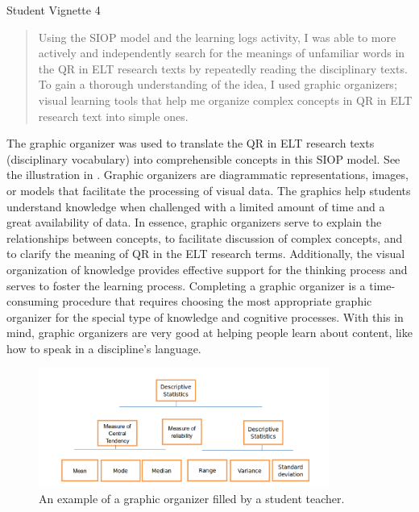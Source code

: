 \documentclass[english]{textolivre}
\begin{document}
Student Vignette 4

\begin{quote}
    Using the SIOP model and the learning logs activity, I was able to more actively and independently search for the meanings of unfamiliar words in the QR in ELT research texts by repeatedly reading the disciplinary texts. To gain a thorough understanding of the idea, I used graphic organizers; visual learning tools that help me organize complex concepts in QR in ELT research text into simple ones.
\end{quote}

The graphic organizer was used to translate the QR in ELT research texts (disciplinary vocabulary) into comprehensible concepts in this SIOP model. See the illustration in . Graphic organizers are diagrammatic representations, images, or models that facilitate the processing of visual data. The graphics help students understand knowledge when challenged with a limited amount of time and a great availability of data. In essence, graphic organizers serve to explain the relationships between concepts, to facilitate discussion of complex concepts, and to clarify the meaning of QR in the ELT research terms. Additionally, the visual organization of knowledge provides effective support for the thinking process and serves to foster the learning process. Completing a graphic organizer is a time-consuming procedure that requires choosing the most appropriate graphic organizer for the special type of knowledge and cognitive processes. With this in mind, graphic organizers are very good at helping people learn about content, like how to speak in a discipline's language.

\begin{figure}[h!]
 \centering
 \includegraphics[width=0.85\textwidth]{Fig1.png}
 \caption{An example of a graphic organizer filled by a student teacher.}
 \label{fig01}
\end{figure}
\end{document}
